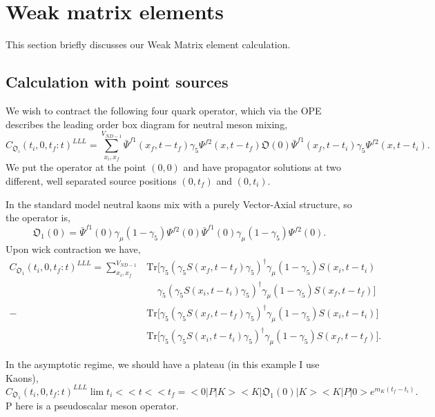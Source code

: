 \section{Weak matrix elements}

This section briefly discusses our Weak Matrix element calculation.

\subsection{Calculation with point sources}

We wish to contract the following four quark operator, which via
the OPE describes the leading order box diagram for neutral meson
mixing,
\begin{equation}
C_{\mathfrak{O}_i}(t_i,0,t_f:t)^{LLL}=\sum_{x_i,x_f}^{V_{ND-1}} \bar{\Psi}^{f1}(x_f,t-t_f)\gamma_5 \Psi^{f2}(x,t-t_f) \mathfrak{O}(0) \bar{\Psi}^{f1}(x_f,t-t_i)\gamma_5 \Psi^{f2}(x,t-t_i).
\end{equation}
We put the operator at the point $(0,0)$ and have propagator solutions
at two different, well separated source positions $(0,t_f)$ and 
$(0,t_i)$.

In the standard model neutral kaons mix with a purely Vector-Axial
structure, so the operator is,
\begin{equation}
\mathfrak{O}_1(0) = \bar{\Psi}^{f1}(0)\gamma_\mu(1-\gamma_5)\Psi^{f2}(0)\bar{\Psi}^{f1}(0)\gamma_\mu(1-\gamma_5)\Psi^{f2}(0).
\end{equation}
Upon wick contraction we have,
\begin{equation}
\begin{aligned}
C_{\mathfrak{O}_1}(t_i,0,t_f:t)^{LLL}=\sum_{x_i,x_f}^{V_{ND-1}}
&\text{Tr}\bigg[
\gamma_5 ( \gamma_5 S(x_f,t-t_f) \gamma_5 )^{\dagger} \gamma_\mu ( 1 - \gamma_5 ) S(x_i,t-t_i)\\
&\:\:\:\:\:\gamma_5 ( \gamma_5 S(x_i,t-t_i) \gamma_5 )^{\dagger} \gamma_\mu ( 1 - \gamma_5 ) S(x_f,t-t_f)
\bigg]\\
-&\text{Tr}\bigg[ 
  \gamma_5 ( \gamma_5 S(x_f,t-t_f) \gamma_5 )^{\dagger} \gamma_\mu ( 1 - \gamma_5 ) S(x_i,t-t_i)
\bigg] \\
&\text{Tr}\bigg[ 
  \gamma_5 ( \gamma_5 S(x_i,t-t_i) \gamma_5 )^{\dagger} \gamma_\mu ( 1 - \gamma_5 ) S(x_f,t-t_f)
\bigg].
\end{aligned}
\end{equation}

In the asymptotic regime, we should have a plateau (in this example I use Kaons),
\begin{equation}
C_{\mathfrak{O}_1}(t_i,0,t_f:t)^{LLL} \lim{t_i<<t<<t_f} = < 0 | P | K >< K | \mathfrak{O}_1(0) | K > < K | P | 0 > e^{m_K (t_f - t_i ) }.  
\end{equation}
P here is a pseudoscalar meson operator.

